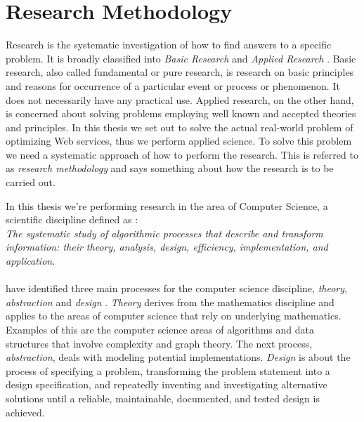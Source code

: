 \section{Research Methodology}

Research is the systematic investigation of how to find answers to a specific
problem. It is broadly classified into \textit{Basic Research} and
\textit{Applied Research} \cite{rajasekar2006research}. Basic research, also
called fundamental or pure research, is research on basic principles and reasons
for occurrence of a particular event or process or phenomenon. It does not
necessarily have any practical use. Applied research, on the other hand, is
concerned about solving problems employing well known and accepted theories and
principles. In this thesis we set out to solve the actual real-world problem of
optimizing Web services, thus we perform applied science. To solve this problem
we need a systematic approach of how to perform the research. This is referred
to as \textit{research methodology} and says something about how the research is
to be carried out.

In this thesis we're performing research in the area of Computer Science, a
scientific discipline defined as \cite{denning}: \\

\textit{The systematic study of algorithmic processes that
describe and transform information: their theory, analysis, design, efficiency,
implementation, and application}.

\paragraph{}

 \citeauthor{denning} have identified three main processes for the computer science
 discipline, \textit{theory, abstraction} and \textit{design} \cite{denning}.
 \textit{Theory} derives from the mathematics discipline and applies to the areas of
 computer science that rely on underlying mathematics. Examples of this are
 the computer science areas of algorithms and data structures that involve
 complexity and graph theory. The next process, \textit{abstraction}, deals with
 modeling potential implementations. \textit{Design} is about the process of
 specifying a problem, transforming the problem statement into a design
 specification, and repeatedly inventing and investigating alternative solutions
 until a reliable, maintainable, documented, and tested design is achieved.

